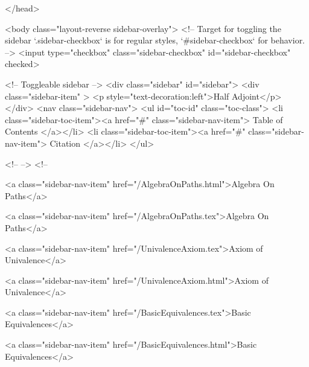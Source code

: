   
</head>




  <body class="layout-reverse sidebar-overlay">
    <!-- Target for toggling the sidebar `.sidebar-checkbox` is for regular
     styles, `#sidebar-checkbox` for behavior. -->
<input type="checkbox" class="sidebar-checkbox" id="sidebar-checkbox" checked>

<!-- Toggleable sidebar -->
<div class="sidebar" id="sidebar">
  <div class="sidebar-item" >
    <p style="text-decoration:left">Half Adjoint</p>
  </div>
  <nav class="sidebar-nav">
    <ul id="toc-id" class="toc-class">
  <li class="sidebar-toc-item"><a href="#" class="sidebar-nav-item"> Table of Contents </a></li>
  <li class="sidebar-toc-item"><a href="#" class="sidebar-nav-item"> Citation </a></li>
</ul>


    <!--  -->
    <!-- 
      
    
      
    
      
    
      
    
      
        
      
    
      
        
          <a class="sidebar-nav-item" href="/AlgebraOnPaths.html">Algebra On Paths</a>
        
      
    
      
        
          <a class="sidebar-nav-item" href="/AlgebraOnPaths.tex">Algebra On Paths</a>
        
      
    
      
        
          <a class="sidebar-nav-item" href="/UnivalenceAxiom.tex">Axiom of Univalence</a>
        
      
    
      
        
          <a class="sidebar-nav-item" href="/UnivalenceAxiom.html">Axiom of Univalence</a>
        
      
    
      
        
          <a class="sidebar-nav-item" href="/BasicEquivalences.tex">Basic Equivalences</a>
        
      
    
      
        
          <a class="sidebar-nav-item" href="/BasicEquivalences.html">Basic Equivalences</a>
        
